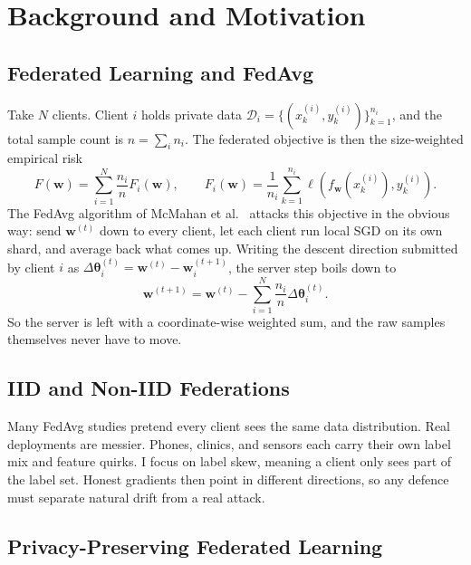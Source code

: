 \chapter{Background and Motivation}
\label{Background:chap:chap2}
\graphicspath{{11.Chapter2/Images/}}

\section{Federated Learning and FedAvg}

Take $N$ clients. Client $i$ holds private data $\mathcal{D}_i=\{(x_k^{(i)},y_k^{(i)})\}_{k=1}^{n_i}$, and the total sample count is $n=\sum_i n_i$. The federated objective is then the size-weighted empirical risk
\begin{equation}
    F(\mathbf{w})=\sum_{i=1}^{N}\frac{n_i}{n}F_i(\mathbf{w}),\qquad
    F_i(\mathbf{w})=\frac{1}{n_i}\sum_{k=1}^{n_i}\ell(f_{\mathbf{w}}(x_k^{(i)}),y_k^{(i)}).
\end{equation}
The FedAvg algorithm of McMahan et al.~\cite{mcmahan2017communication} attacks this objective in the obvious way: send $\mathbf{w}^{(t)}$ down to every client, let each client run local SGD on its own shard, and average back what comes up. Writing the descent direction submitted by client $i$ as $\Delta\boldsymbol{\theta}_i^{(t)}=\mathbf{w}^{(t)}-\mathbf{w}_i^{(t+1)}$, the server step boils down to
\begin{equation}
    \mathbf{w}^{(t+1)}=\mathbf{w}^{(t)}-\sum_{i=1}^{N}\frac{n_i}{n}\Delta\boldsymbol{\theta}_i^{(t)}.
\end{equation}
So the server is left with a coordinate-wise weighted sum, and the raw samples themselves never have to move.

\section{IID and Non-IID Federations}

Many FedAvg studies pretend every client sees the same data distribution. Real deployments are messier. Phones, clinics, and sensors each carry their own label mix and feature quirks. I focus on label skew, meaning a client only sees part of the label set. Honest gradients then point in different directions, so any defence must separate natural drift from a real attack.

\section{Privacy-Preserving Federated Learning}

